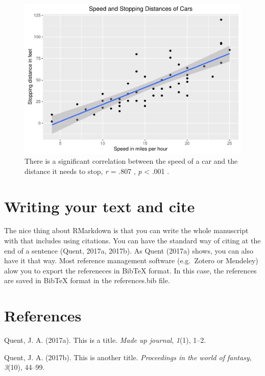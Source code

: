 \documentclass[12pt,]{article}
\begin{document}
\begin{figure}[htbp]
\centering
\includegraphics{methodsDay2017_example_files/figure-latex/unnamed-chunk-2-1.pdf}
\caption{There is a significant correlation between the speed of a car
and the distance it needs to stop, \emph{r} = .807 , \emph{p}
\textless{} .001 .}
\end{figure}

\section{Writing your text and cite}\label{writing-your-text-and-cite}

The nice thing about RMarkdown is that you can write the whole
manuscript with that includes using citations. You can have the standard
way of citing at the end of a sentence (Quent, 2017a, 2017b). As Quent
(2017a) shows, you can also have it that way. Most reference management
software (e.g.~Zotero or Mendeley) alow you to export the refereneces in
BibTeX format. In this case, the references are saved in BibTeX format
in the references.bib file.

\section*{References}\label{references}

\hypertarget{refs}{}
\hypertarget{ref-Quent2017a}{}
Quent, J. A. (2017a). This is a title. \emph{Made up journal},
\emph{1}(1), 1--2.

\hypertarget{ref-Quent2017b}{}
Quent, J. A. (2017b). This is another title. \emph{Proceedings in the
world of fantasy}, \emph{3}(10), 44--99.
\end{document}
